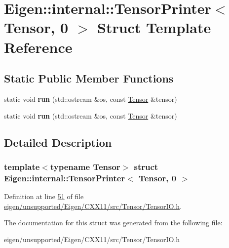 \hypertarget{struct_eigen_1_1internal_1_1_tensor_printer_3_01_tensor_00_010_01_4}{}\section{Eigen\+:\+:internal\+:\+:Tensor\+Printer$<$ Tensor, 0 $>$ Struct Template Reference}
\label{struct_eigen_1_1internal_1_1_tensor_printer_3_01_tensor_00_010_01_4}
\subsection*{Static Public Member Functions}
\begin{DoxyCompactItemize}
\item 
\mbox{\label{struct_eigen_1_1internal_1_1_tensor_printer_3_01_tensor_00_010_01_4_a4ed64d0c0cceee3f2aec009c833937e0}} 
static void {\bfseries run} (std\+::ostream \&os, const \hyperlink{class_eigen_1_1_tensor}{Tensor} \&tensor)
\item 
\mbox{\label{struct_eigen_1_1internal_1_1_tensor_printer_3_01_tensor_00_010_01_4_a4ed64d0c0cceee3f2aec009c833937e0}} 
static void {\bfseries run} (std\+::ostream \&os, const \hyperlink{class_eigen_1_1_tensor}{Tensor} \&tensor)
\end{DoxyCompactItemize}


\subsection{Detailed Description}
\subsubsection*{template$<$typename Tensor$>$\newline
struct Eigen\+::internal\+::\+Tensor\+Printer$<$ Tensor, 0 $>$}



Definition at line \hyperlink{eigen_2unsupported_2_eigen_2_c_x_x11_2src_2_tensor_2_tensor_i_o_8h_source_l00051}{51} of file \hyperlink{eigen_2unsupported_2_eigen_2_c_x_x11_2src_2_tensor_2_tensor_i_o_8h_source}{eigen/unsupported/\+Eigen/\+C\+X\+X11/src/\+Tensor/\+Tensor\+I\+O.\+h}.



The documentation for this struct was generated from the following file\+:\begin{DoxyCompactItemize}
\item 
eigen/unsupported/\+Eigen/\+C\+X\+X11/src/\+Tensor/\+Tensor\+I\+O.\+h\end{DoxyCompactItemize}

